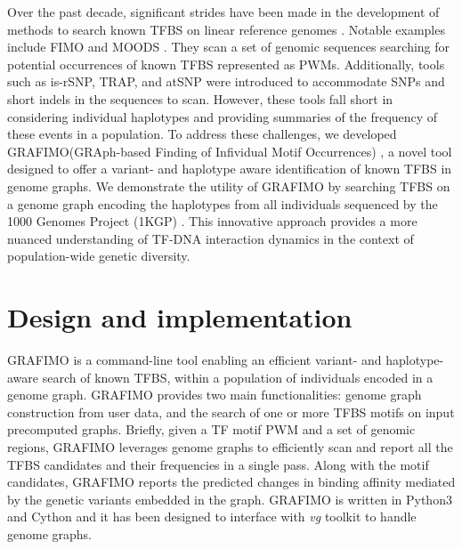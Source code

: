 \documentclass[a4paper, titlepage, openright]{book}
\newcommand{\grafimo}{GRAFIMO\xspace}
\begin{document}
Over the past decade, significant strides have been made in the development of methods to search known TFBS on linear reference genomes \citep{tognon2023survey, boeva2016analysis}. Notable examples include FIMO \citep{grant2011fimo} and MOODS \citep{korhonen2009moods}. They scan a set of genomic sequences searching for potential occurrences of known TFBS represented as PWMs. Additionally, tools such as is-rSNP, TRAP, and atSNP \citep{macintyre2010rsnp, thomas2011transcription, zuo2015atsnp} were introduced to accommodate SNPs and short indels in the sequences to scan. However, these tools fall short in considering individual haplotypes and providing summaries of the frequency of these events in a population. To address these challenges, we developed \grafimo (GRAph-based Finding of Infividual Motif Occurrences) \citep{tognon2021grafimo}, a novel tool designed to offer a variant- and haplotype aware identification of known TFBS in genome graphs. We demonstrate the utility of \grafimo by searching TFBS on a genome graph encoding the haplotypes from all individuals sequenced by the 1000 Genomes Project (1KGP) \citep{siva20081000, zheng2017alignment}. This innovative approach provides a more nuanced understanding of TF-DNA interaction dynamics in the context of population-wide genetic diversity.

\section{Design and implementation}
\grafimo is a command-line tool enabling an efficient variant- and haplotype-aware search of known TFBS, within a population of individuals encoded in a genome graph. \grafimo provides two main functionalities: genome graph construction from user data, and the search of one or more TFBS motifs on input precomputed graphs. Briefly, given a TF motif PWM and a set of genomic regions, \grafimo leverages genome graphs to efficiently scan and report all the TFBS candidates and their frequencies in a single pass. Along with the motif candidates, \grafimo reports the predicted changes in binding affinity mediated by the genetic variants embedded in the graph. \grafimo is written in Python3 and Cython and it has been designed to interface with \emph{vg} toolkit to handle genome graphs.

\end{document}
